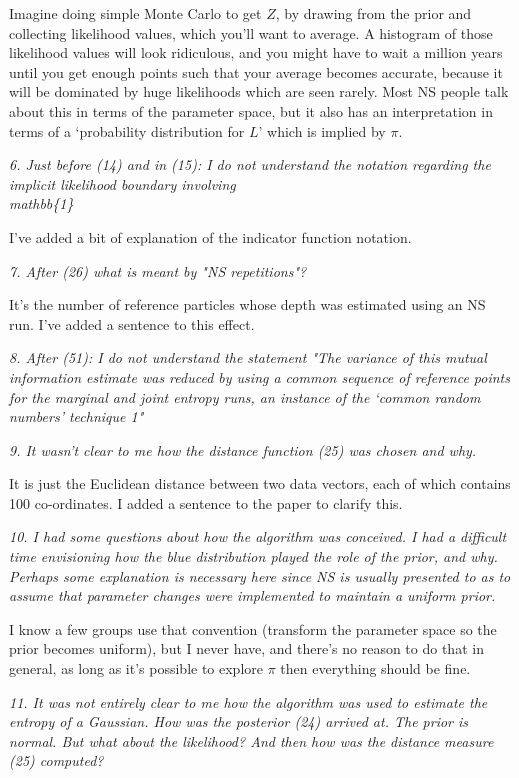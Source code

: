 \documentclass[a4paper, 12pt]{article}
\renewcommand{\quote}{\em}
\begin{document}
Imagine doing simple Monte Carlo to get $Z$, by drawing from the prior and
collecting likelihood values, which you'll want to average. A histogram of
those likelihood values will look ridiculous, and you might have to wait
a million years until you get enough points such that your average becomes
accurate, because it will be dominated by huge likelihoods which are seen
rarely. Most NS people talk about this in terms of the parameter space, but
it also has an interpretation in terms of a `probability distribution for
$L$' which is implied by $\pi$.

{\quote
6. Just before (14) and in (15): I do not understand the notation regarding the implicit likelihood boundary involving \\mathbb\{1\}}

I've added a bit of explanation of the indicator function notation.

{\quote
7. After (26) what is meant by "NS repetitions"?}

It's the number of reference particles
whose depth was estimated using an NS run. I've added a sentence to this effect.

{\quote
8. After (51): I do not understand the statement "The variance of this mutual information estimate was reduced by using a common sequence of reference points for the marginal and joint entropy runs, an instance of the ‘common random numbers’ technique 1"}

{\quote
9. It wasn't clear to me how the distance function (25) was chosen and why.}

It is just the Euclidean distance between two data vectors, each of which
contains 100 co-ordinates. I added a sentence to the paper to clarify this.

{\quote
10. I had some questions about how the algorithm was conceived.  I had a difficult time envisioning how the blue distribution played the role of the prior, and why.  Perhaps some explanation is necessary here since NS is usually presented to as to assume that parameter changes were implemented to maintain a uniform prior.}

I know a few groups use that convention (transform the parameter space so
the prior becomes uniform), but I never have, and there's no reason to do
that in general, as long as it's possible to explore $\pi$ then everything
should be fine.

{\quote
11.  It was not entirely clear to me how the algorithm was used to estimate the entropy of a Gaussian.  How was the posterior (24) arrived at.  The prior is normal.  But what about the likelihood?  And then how was the distance measure (25) computed?}
\end{document}
